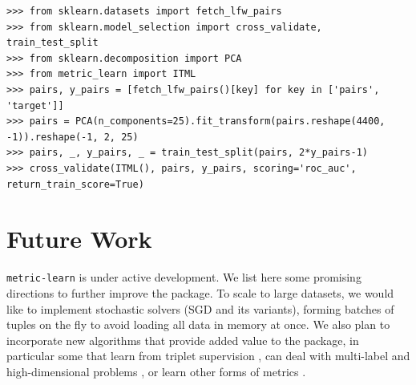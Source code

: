 \documentclass[twoside,11pt]{article}
\newcommand{\aurelien}[1]{\todo[inline,caption={},color=orange!40]{{\it Aurelien:~}#1}}
\newcommand{\william}[1]{\todo[inline,caption={},color=blue!40]{{\it William:~}#1}}
\begin{document}
\begin{verbatim}
>>> from sklearn.datasets import fetch_lfw_pairs 
>>> from sklearn.model_selection import cross_validate, train_test_split 
>>> from sklearn.decomposition import PCA 
>>> from metric_learn import ITML 
>>> pairs, y_pairs = [fetch_lfw_pairs()[key] for key in ['pairs', 'target']]
>>> pairs = PCA(n_components=25).fit_transform(pairs.reshape(4400, -1)).reshape(-1, 2, 25) 
>>> pairs, _, y_pairs, _ = train_test_split(pairs, 2*y_pairs-1)  
>>> cross_validate(ITML(), pairs, y_pairs, scoring='roc_auc', return_train_score=True)
\end{verbatim}


\section{Future Work}

\texttt{metric-learn} is under active development. We list here some promising directions to further improve the package. To scale to large datasets, we would like to implement stochastic solvers (SGD and its variants), forming batches of tuples on the fly to avoid loading all data in memory at once. %
We also plan to incorporate new algorithms that provide added value to the package, in particular some that learn from triplet supervision \citep{Schultz2003a}, can deal with multi-label \citep{liu15} and high-dimensional problems \citep{Liu19}, or learn other forms of metrics \citep[e.g., nonlinear ones, bilinear similarities, and multiple local metrics, see][]{Bellet15}.
\end{document}
